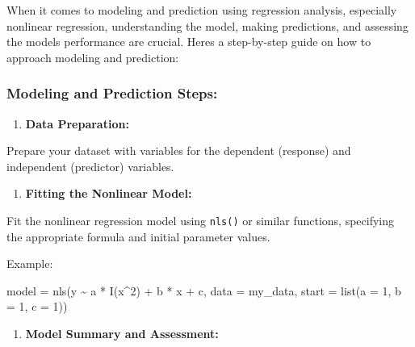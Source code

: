 \documentclass[
]{article}
\newenvironment{Shaded}{}{}
\newcommand{\AttributeTok}[1]{\textcolor[rgb]{0.49,0.56,0.16}{#1}}
\newcommand{\DecValTok}[1]{\textcolor[rgb]{0.25,0.63,0.44}{#1}}
\newcommand{\FunctionTok}[1]{\textcolor[rgb]{0.02,0.16,0.49}{#1}}
\newcommand{\NormalTok}[1]{#1}
\newcommand{\OtherTok}[1]{\textcolor[rgb]{0.00,0.44,0.13}{#1}}
\newcommand{\SpecialCharTok}[1]{\textcolor[rgb]{0.25,0.44,0.63}{#1}}
\begin{document}
When it comes to modeling and prediction using regression analysis,
especially nonlinear regression, understanding the model, making
predictions, and assessing the model\textquotesingle s performance are
crucial. Here\textquotesingle s a step-by-step guide on how to approach
modeling and prediction:

\hypertarget{modeling-and-prediction-steps}{%
\subsubsection{Modeling and Prediction
Steps:}\label{modeling-and-prediction-steps}}

\begin{enumerate}
\def\labelenumi{\arabic{enumi}.}
\item
  \textbf{Data Preparation:}
\end{enumerate}

Prepare your dataset with variables for the dependent (response) and
independent (predictor) variables.

\begin{enumerate}
\def\labelenumi{\arabic{enumi}.}
\item
  \textbf{Fitting the Nonlinear Model:}
\end{enumerate}

Fit the nonlinear regression model using \texttt{nls()} or similar
functions, specifying the appropriate formula and initial parameter
values.

Example:

\begin{Shaded}
\begin{Highlighting}[]
\NormalTok{model }\OtherTok{=} 
\FunctionTok{nls}\NormalTok{(y }\SpecialCharTok{\textasciitilde{}}\NormalTok{ a }\SpecialCharTok{*} \FunctionTok{I}\NormalTok{(x}\SpecialCharTok{\^{}}\DecValTok{2}\NormalTok{) }\SpecialCharTok{+}\NormalTok{ b }\SpecialCharTok{*}\NormalTok{ x }\SpecialCharTok{+}\NormalTok{ c, }
    \AttributeTok{data =}\NormalTok{ my\_data,}
    \AttributeTok{start =} \FunctionTok{list}\NormalTok{(}\AttributeTok{a =} \DecValTok{1}\NormalTok{, }\AttributeTok{b =} \DecValTok{1}\NormalTok{, }\AttributeTok{c =} \DecValTok{1}\NormalTok{))}
\end{Highlighting}
\end{Shaded}

\begin{enumerate}
\def\labelenumi{\arabic{enumi}.}
\item
  \textbf{Model Summary and Assessment:}
\end{enumerate}
\end{document}
